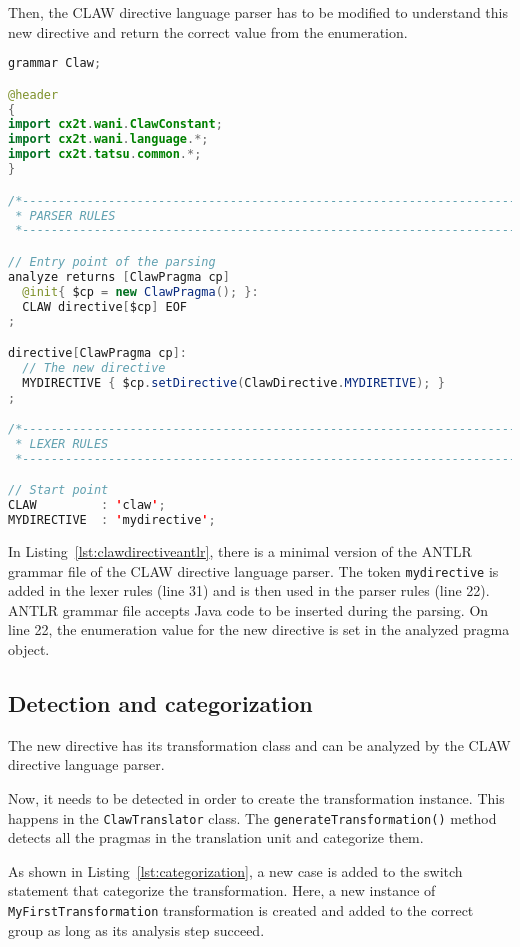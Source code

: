 Then, the CLAW directive language parser has to be modified to understand
this new directive and return the correct value from the enumeration.

\begin{lstlisting}[label=lst:clawdirectiveantlr, caption=Claw.g4,
  language=java]
grammar Claw;

@header
{
import cx2t.wani.ClawConstant;
import cx2t.wani.language.*;
import cx2t.tatsu.common.*;
}

/*----------------------------------------------------------------------------
 * PARSER RULES
 *----------------------------------------------------------------------------*/

// Entry point of the parsing
analyze returns [ClawPragma cp]
  @init{ $cp = new ClawPragma(); }:
  CLAW directive[$cp] EOF
;

directive[ClawPragma cp]:
  // The new directive
  MYDIRECTIVE { $cp.setDirective(ClawDirective.MYDIRETIVE); }
;

/*----------------------------------------------------------------------------
 * LEXER RULES
 *----------------------------------------------------------------------------*/

// Start point
CLAW         : 'claw';
MYDIRECTIVE  : 'mydirective';
\end{lstlisting}

In Listing~\ref{lst:clawdirectiveantlr}, there is a minimal version of the
ANTLR grammar file of the CLAW directive language parser. The token
\lstinline|mydirective| is added in the lexer rules (line 31) and is then
used in the parser rules (line 22). ANTLR grammar file accepts Java code
to be inserted during the parsing. On line 22, the enumeration value for
the new directive is set in the analyzed pragma object.

\subsection{Detection and categorization}
The new directive has its transformation class and can be analyzed by the
CLAW directive language parser.

Now, it needs to be detected in order to create the transformation instance.
This happens in the \lstinline|ClawTranslator| class. The
\lstinline|generateTransformation()| method detects all the pragmas in the
translation unit and categorize them.

As shown in Listing~\ref{lst:categorization}, a new case is added to the switch
statement that categorize the transformation. Here, a new instance of
\lstinline|MyFirstTransformation| transformation is created and added to the
correct group as long as its analysis step succeed.

